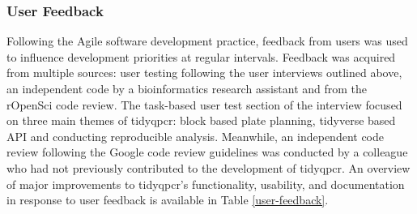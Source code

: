 \documentclass[../main.tex]{subfiles}
\begin{document}
\subsubsection{User Feedback}
Following the Agile software development practice, feedback from users was used to influence development priorities at regular intervals. 
Feedback was acquired from multiple sources: user testing following the user interviews outlined above, an independent code by a bioinformatics research assistant and from the rOpenSci code review.
The task-based  user test section of the interview focused on three main themes of tidyqpcr: block based plate planning, tidyverse based API and conducting reproducible analysis.
Meanwhile, an independent code review following the Google code review guidelines was conducted by a colleague who had not previously contributed to the development of tidyqpcr.
An overview of major improvements to tidyqpcr's functionality, usability, and documentation in response to user feedback is available in Table \ref{user-feedback}.
\end{document}
